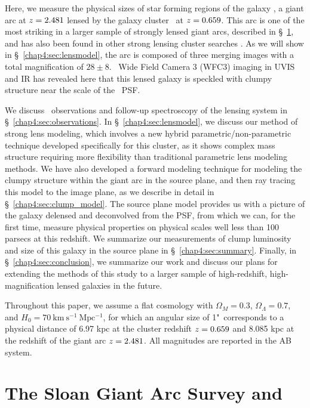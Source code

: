 Here, we measure the physical sizes of star forming regions of the galaxy \giantarc, a giant arc at $z=2.481$ lensed by the galaxy cluster \cluster\ at $z=0.659$. This arc is one of the most striking in a larger sample of strongly lensed giant arcs, described in \S~\ref{chap4:sec:sgas}, and has also been found in other strong lensing cluster searches \citep{Stark:2013kl}. As we will show in \S~\ref{chap4:sec:lensmodel}, the arc is composed of three merging images with a total magnification of $28\pm8$. \hst\ Wide Field Camera 3 (WFC3) imaging in UVIS and IR has revealed here that this lensed galaxy is speckled with clumpy structure near the scale of the \hst\ PSF.

We discuss \hst\ observations and follow-up spectroscopy of the lensing system in \S~\ref{chap4:sec:observations}. In \S~\ref{chap4:sec:lensmodel}, we discuss our method of strong lens modeling, which involves a new hybrid parametric/non-parametric technique developed specifically for this cluster, as it shows complex mass structure requiring more flexibility than traditional parametric lens modeling methods. We have also developed a forward modeling technique for modeling the clumpy structure within the giant arc in the source plane, and then ray tracing this model to the image plane, as we describe in detail in \S~\ref{chap4:sec:clump_model}. The source plane model provides us with a picture of the galaxy delensed and deconvolved from the PSF, from which we can, for the first time, measure physical properties on physical scales well less than 100 parsecs at this redshift. We summarize our measurements of clump luminosity and size of this galaxy in the source plane in \S~\ref{chap4:sec:summary}. Finally, in \S~\ref{chap4:sec:conclusion}, we summarize our work and discuss our plans for extending the methods of this study to a larger sample of high-redshift, high-magnification lensed galaxies in the future.

Throughout this paper, we assume a flat cosmology with $\Omega_M=0.3$, $\Omega_\Lambda=0.7$, and $H_0=70\ \mathrm{km\ s^{-1}\ Mpc^{-1}}$, for which an angular size of 1"\ corresponds to a physical distance of 6.97 kpc at the cluster redshift $z=0.659$ and 8.085 kpc at the redshift of the giant arc $z=2.481$. All magnitudes are reported in the AB system.

\section{The Sloan Giant Arc Survey and \giantarc}
\label{chap4:sec:sgas}

